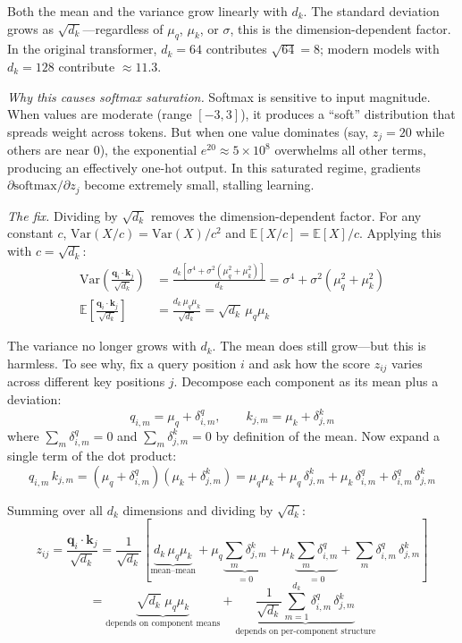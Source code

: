 \begin{notebox}
Both the mean and the variance grow linearly with $d_k$. The standard deviation grows as $\sqrt{d_k}$---regardless of $\mu_q$, $\mu_k$, or $\sigma$, this is the dimension-dependent factor. In the original transformer, $d_k = 64$ contributes $\sqrt{64} = 8$; modern models with $d_k = 128$ contribute $\approx 11.3$.

\emph{Why this causes softmax saturation.} Softmax is sensitive to input magnitude. When values are moderate (range $[-3, 3]$), it produces a ``soft'' distribution that spreads weight across tokens. But when one value dominates (say, $z_j = 20$ while others are near 0), the exponential $e^{20} \approx 5 \times 10^8$ overwhelms all other terms, producing an effectively one-hot output. In this saturated regime, gradients $\partial\text{softmax}/\partial z_j$ become extremely small, stalling learning.

\emph{The fix.} Dividing by $\sqrt{d_k}$ removes the dimension-dependent factor. For any constant $c$, $\text{Var}(X/c) = \text{Var}(X)/c^2$ and $\mathbb{E}[X/c] = \mathbb{E}[X]/c$. Applying this with $c = \sqrt{d_k}$:
\begin{align}
\text{Var}\!\left(\frac{\mathbf{q}_i \cdot \mathbf{k}_j}{\sqrt{d_k}}\right) &= \frac{d_k[\sigma^4 + \sigma^2(\mu_q^2 + \mu_k^2)]}{d_k} = \sigma^4 + \sigma^2(\mu_q^2 + \mu_k^2) \\
\mathbb{E}\!\left[\frac{\mathbf{q}_i \cdot \mathbf{k}_j}{\sqrt{d_k}}\right] &= \frac{d_k\, \mu_q \mu_k}{\sqrt{d_k}} = \sqrt{d_k}\, \mu_q \mu_k
\end{align}

The variance no longer grows with $d_k$. The mean does still grow---but this is harmless. To see why, fix a query position $i$ and ask how the score $z_{ij}$ varies across different key positions $j$. Decompose each component as its mean plus a deviation:
\[
q_{i,m} = \mu_q + \delta^q_{i,m}, \qquad k_{j,m} = \mu_k + \delta^k_{j,m}
\]
where $\sum_m \delta^q_{i,m} = 0$ and $\sum_m \delta^k_{j,m} = 0$ by definition of the mean. Now expand a single term of the dot product:
\[
q_{i,m}\, k_{j,m} = (\mu_q + \delta^q_{i,m})(\mu_k + \delta^k_{j,m}) = \mu_q \mu_k + \mu_q\, \delta^k_{j,m} + \mu_k\, \delta^q_{i,m} + \delta^q_{i,m}\, \delta^k_{j,m}
\]

Summing over all $d_k$ dimensions and dividing by $\sqrt{d_k}$:
\begin{equation}
z_{ij} = \frac{\mathbf{q}_i \cdot \mathbf{k}_j}{\sqrt{d_k}} = \frac{1}{\sqrt{d_k}}\left[\underbrace{d_k\, \mu_q \mu_k}_{\text{mean--mean}} + \mu_q \underbrace{\sum_m \delta^k_{j,m}}_{= 0} + \mu_k \underbrace{\sum_m \delta^q_{i,m}}_{= 0} + \sum_m \delta^q_{i,m}\, \delta^k_{j,m}\right]
\end{equation}
\[
= \underbrace{\sqrt{d_k}\; \mu_q \mu_k}_{\text{depends on component means}} + \underbrace{\frac{1}{\sqrt{d_k}} \sum_{m=1}^{d_k} \delta^q_{i,m}\, \delta^k_{j,m}}_{\text{depends on per-component structure}}
\]


\end{notebox}
